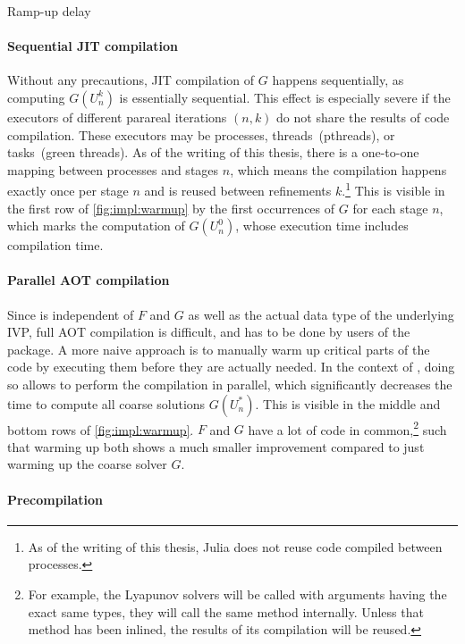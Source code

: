 \begin{table}[tb]
  \caption{Ramp-up delay}
\end{table}

\paragraph{Sequential \ac{JIT} compilation}

Without any precautions,
\ac{JIT} compilation of $G$ happens sequentially,
as computing $G(U_n^k)$ is essentially sequential.
This effect is especially severe if the executors of different parareal iterations $(n,k)$ do not share the results of code compilation.
These executors may be processes, threads~(pthreads), or tasks~(green threads).
As of the writing of this thesis,
there is a one-to-one mapping between processes and stages $n$,
which means the compilation happens exactly once per stage $n$ and is reused between refinements $k$.\footnote{%
  As of the writing of this thesis, Julia does not reuse code compiled between processes.
}
This is visible in the first row of \autoref{fig:impl:warmup}
by the first occurrences of $G$ for each stage $n$,
which marks the computation of $G(U_n^0)$,
whose execution time includes compilation time.

\paragraph{Parallel \acs{AOT} compilation}

Since  is independent of $F$ and $G$ as well as the actual data type of the underlying \ac{IVP},
full \ac{AOT} compilation is difficult, and has to be done by users of the package.
A more naive approach is to manually warm up critical parts of the code by executing them before they are actually needed.
In the context of ,
doing so allows to perform the compilation in parallel,
which significantly decreases the time to compute all coarse solutions $G(U_n^*)$.
This is visible in the middle and bottom rows of \autoref{fig:impl:warmup}.
$F$ and $G$ have a lot of code in common,\footnote{%
  For example, the Lyapunov solvers will be called with arguments having the exact same types,
  \ie they will call the same method internally.
  Unless that method has been inlined, the results of its compilation will be reused.
}
such that warming up both shows a much smaller improvement compared to just warming up the coarse solver $G$.

\paragraph{Precompilation}


